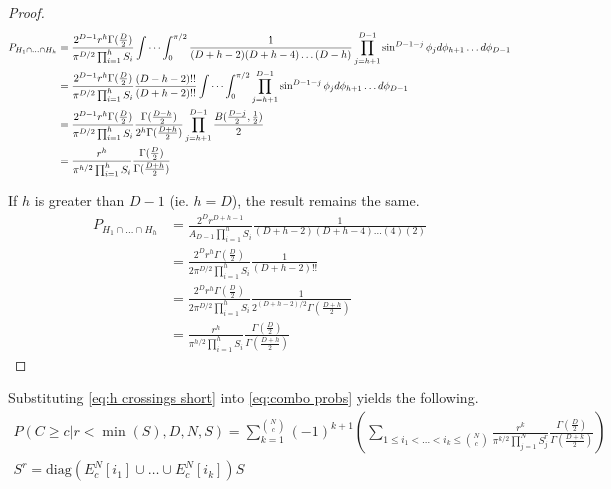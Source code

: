\documentclass{article}
\begin{document}
\begin{proof}
	\begin{align}
		P_{H_1\cap\hdots\cap H_h} &= \frac{2^{D-1}r^h\Gamma(\frac{D}{2})}{\pi^{D/2}\prod_{i=1}^h S_i} \idotsint_0^{\pi/2} \frac{1}{(D+h-2)(D+h-4)\hdots(D-h)} \prod_{j=h+1}^{D-1}\sin^{D-1-j}\phi_j d\phi_{h+1} \hdots d\phi_{D-1} \\
		&= \frac{2^{D-1}r^h\Gamma(\frac{D}{2})}{\pi^{D/2}\prod_{i=1}^h S_i} \frac{(D-h-2)!!}{(D+h-2)!!} \idotsint_0^{\pi/2} \prod_{j=h+1}^{D-1}\sin^{D-1-j}\phi_j d\phi_{h+1} \hdots d\phi_{D-1} \\
		&= \frac{2^{D-1}r^h\Gamma(\frac{D}{2})}{\pi^{D/2}\prod_{i=1}^h S_i} \frac{\Gamma(\frac{D-h}{2})}{2^h \Gamma(\frac{D+h}{2})} \prod_{j=h+1}^{D-1}\frac{B(\frac{D-j}{2}, \frac{1}{2})}{2} \\
		&= \frac{r^{h}}{\pi^{h/2}\prod_{i=1}^h S_i} \frac{\Gamma(\frac{D}{2})}{\Gamma(\frac{D+h}{2})} \\
	\end{align}

	If $h$ is greater than $D-1$ (ie. $h=D$), the result remains the same.
	\begin{align}
		P_{H_1\cap\hdots\cap H_h} &= \frac{2^Dr^{D+h-1}}{A_{D-1}\prod_{i=1}^h S_i}  \frac{1}{(D+h-2)(D+h-4)\hdots(4)(2)}  \\
		&= \frac{2^Dr^{h} \Gamma(\frac{D}{2})}{2 \pi^{D/2} \prod_{i=1}^h S_i} \frac{1}{(D+h-2)!!} \\
		&= \frac{2^Dr^{h} \Gamma(\frac{D}{2})}{2 \pi^{D/2} \prod_{i=1}^h S_i} \frac{1}{2^{(D+h-2)/2} \Gamma(\frac{D+h}{2})} \\
		&= \frac{r^{h}}{\pi^{h/2} \prod_{i=1}^h S_i} \frac{\Gamma(\frac{D}{2})}{\Gamma(\frac{D+h}{2})} \label{eq:h crossings short}
	\end{align}
\end{proof}

Substituting \ref{eq:h crossings short} into \ref{eq:combo probs} yields the following.
\begin{gather}
	P(C\ge c|r<\min(S), D, N, S) = \sum_{k=1}^{N\choose c} (-1)^{k+1}\left(\sum_{1\le i_1 < \hdots < i_k \le {N\choose c}}\frac{r^k}{\pi^{k/2} \prod_{j=1}^N S^r_j}\frac{\Gamma(\frac{D}{2})}{\Gamma(\frac{D+k}{2})} \right) \\
	S^r = \text{diag}(E_c^N[i_1]\cup\hdots\cup E_c^N[i_k]) S
\end{gather}
\end{document}

